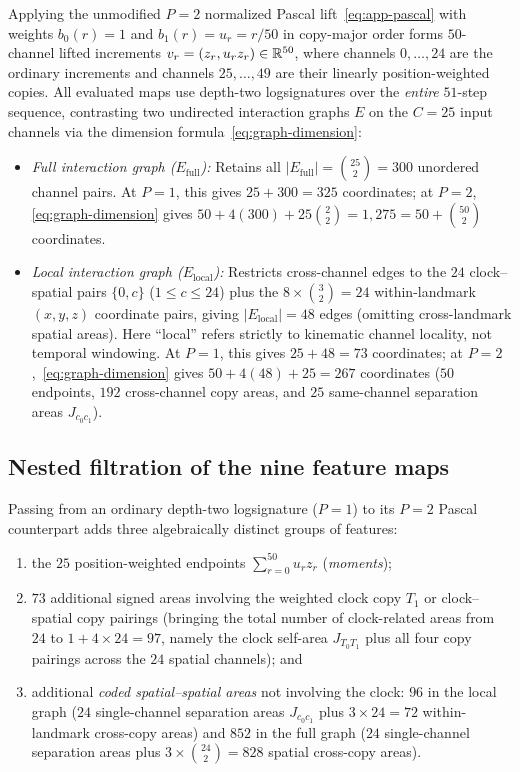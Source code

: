 Applying the unmodified \(P = 2\) normalized Pascal lift~\eqref{eq:app-pascal}
with weights \(b_0(r) = 1\) and \(b_1(r) = u_r = r/50\) in copy-major order forms
\(50\)-channel lifted increments \(v_r = (z_r, u_r z_r) \in \mathbb{R}^{50}\), where
channels \(0, \ldots, 24\) are the ordinary increments and channels
\(25, \ldots, 49\) are their linearly position-weighted copies. All evaluated
maps use depth-two logsignatures over the \emph{entire} \(51\)-step sequence,
contrasting two undirected interaction graphs \(E\) on the \(C = 25\) input
channels via the dimension formula~\eqref{eq:graph-dimension}:
\begin{itemize}
\item \emph{Full interaction graph (\(E_{\mathrm{full}}\)):} Retains all
\(|E_{\mathrm{full}}| = \binom{25}{2} = 300\) unordered channel pairs. At
\(P = 1\), this gives \(25 + 300 = 325\) coordinates; at \(P = 2\),
\eqref{eq:graph-dimension} gives \(50 + 4(300) + 25\binom{2}{2} = 1{,}275 = 50 + \binom{50}{2}\)
coordinates.
\item \emph{Local interaction graph (\(E_{\mathrm{local}}\)):} Restricts
cross-channel edges to the \(24\) clock--spatial pairs \(\{0, c\}\)
(\(1 \leq c \leq 24\)) plus the \(8 \times \binom{3}{2} = 24\) within-landmark
\((x, y, z)\) coordinate pairs, giving \(|E_{\mathrm{local}}| = 48\) edges
(omitting cross-landmark spatial areas). Here ``local'' refers strictly to
kinematic channel locality, not temporal windowing. At \(P = 1\), this gives
\(25 + 48 = 73\) coordinates; at \(P = 2\),~\eqref{eq:graph-dimension} gives
\(50 + 4(48) + 25 = 267\) coordinates (\(50\) endpoints, \(192\) cross-channel
copy areas, and \(25\) same-channel separation areas \(J_{c_0 c_1}\)).
\end{itemize}

\subsection{Nested filtration of the nine feature maps}
Passing from an ordinary depth-two logsignature (\(P=1\)) to its \(P=2\) Pascal
counterpart adds three algebraically distinct groups of features:
\begin{enumerate}
\item the \(25\) position-weighted endpoints \(\sum_{r=0}^{50} u_r z_r\)
(\emph{moments});
\item \(73\) additional signed areas involving the weighted clock copy \(T_1\) or
clock--spatial copy pairings (bringing the total number of clock-related areas
from \(24\) to \(1 + 4 \times 24 = 97\), namely the clock self-area \(J_{T_0 T_1}\)
plus all four copy pairings across the \(24\) spatial channels); and
\item additional \emph{coded spatial--spatial areas} not involving the clock:
\(96\) in the local graph (\(24\) single-channel separation areas \(J_{c_0 c_1}\)
plus \(3 \times 24 = 72\) within-landmark cross-copy areas) and \(852\) in the
full graph (\(24\) single-channel separation areas plus \(3 \times \binom{24}{2} = 828\)
spatial cross-copy areas).
\end{enumerate}

